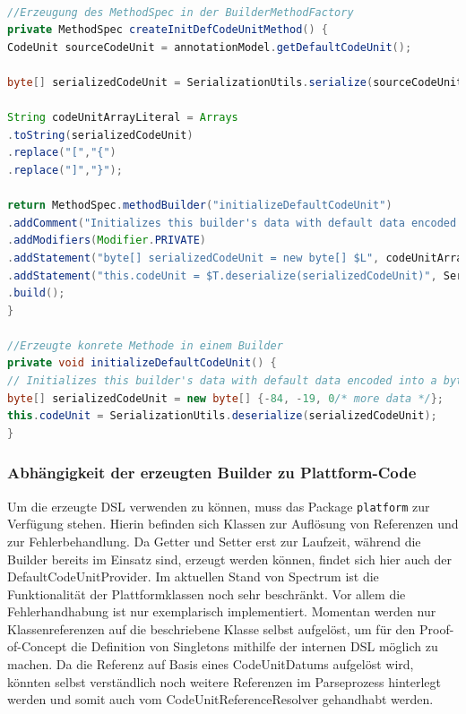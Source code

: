 \documentclass[12pt,oneside,a4paper,parskip]{scrbook}
\begin{document}
\begin{lstlisting}[label=lst:defcu,
language=java,
firstnumber=1,
caption=Quelltext zur Erzeugung des MethodSpecs für die Builder-Methode initializeDefaultCodeUnit und die daraus resultierende konrekte Methode in einem Builder.]

//Erzeugung des MethodSpec in der BuilderMethodFactory
private MethodSpec createInitDefCodeUnitMethod() {
CodeUnit sourceCodeUnit = annotationModel.getDefaultCodeUnit();

byte[] serializedCodeUnit = SerializationUtils.serialize(sourceCodeUnit);

String codeUnitArrayLiteral = Arrays
.toString(serializedCodeUnit)
.replace("[","{")
.replace("]","}");

return MethodSpec.methodBuilder("initializeDefaultCodeUnit")
.addComment("Initializes this builder's data with default data encoded into a byte[]")
.addModifiers(Modifier.PRIVATE)
.addStatement("byte[] serializedCodeUnit = new byte[] $L", codeUnitArrayLiteral)
.addStatement("this.codeUnit = $T.deserialize(serializedCodeUnit)", SerializationUtils.class)
.build();
}

//Erzeugte konrete Methode in einem Builder
private void initializeDefaultCodeUnit() {
// Initializes this builder's data with default data encoded into a byte[]
byte[] serializedCodeUnit = new byte[] {-84, -19, 0/* more data */};
this.codeUnit = SerializationUtils.deserialize(serializedCodeUnit);
}
\end{lstlisting}

\subsubsection{Abhängigkeit der erzeugten Builder zu Plattform-Code}\label{sec:plattform}

Um die erzeugte DSL verwenden zu können, muss das Package \texttt{platform} zur Verfügung stehen. Hierin befinden sich Klassen zur Auflösung von Referenzen und zur Fehlerbehandlung. Da Getter und Setter erst zur Laufzeit, während die Builder bereits im Einsatz sind, erzeugt werden können, findet sich hier auch der DefaultCodeUnitProvider. Im aktuellen Stand von Spectrum ist die Funktionalität der Plattformklassen noch sehr beschränkt. Vor allem die Fehlerhandhabung ist nur exemplarisch implementiert. Momentan werden nur Klassenreferenzen auf die beschriebene Klasse selbst aufgelöst, um für den Proof-of-Concept die Definition von Singletons mithilfe der internen DSL möglich zu machen. Da die Referenz auf Basis eines CodeUnitDatums aufgelöst wird, könnten selbst verständlich noch weitere Referenzen im Parseprozess hinterlegt werden und somit auch vom CodeUnitReferenceResolver gehandhabt werden.
\end{document}
